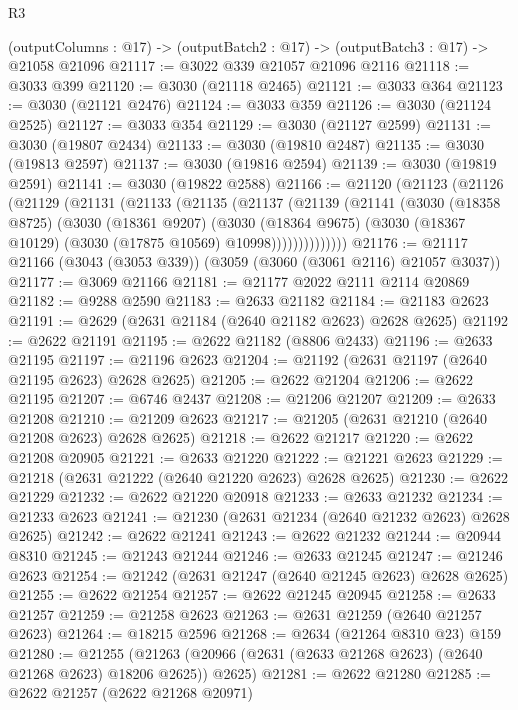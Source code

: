 \begin{lexlean}{R3}
\begin{coremodule}
  (outputColumns : @17) -> (outputBatch2 : @17) -> (outputBatch3 : @17) -> @21058 @21096
@21117 := @3022 @339 @21057 @21096 @2116
@21118 := @3033 @399
@21120 := @3030 (@21118 @2465)
@21121 := @3033 @364
@21123 := @3030 (@21121 @2476)
@21124 := @3033 @359
@21126 := @3030 (@21124 @2525)
@21127 := @3033 @354
@21129 := @3030 (@21127 @2599)
@21131 := @3030 (@19807 @2434)
@21133 := @3030 (@19810 @2487)
@21135 := @3030 (@19813 @2597)
@21137 := @3030 (@19816 @2594)
@21139 := @3030 (@19819 @2591)
@21141 := @3030 (@19822 @2588)
@21166 := @21120
    (@21123
      (@21126
        (@21129
          (@21131
            (@21133
              (@21135
                (@21137
                  (@21139
                    (@21141
                      (@3030
                        (@18358 @8725)
                        (@3030
                          (@18361 @9207)
                          (@3030
                            (@18364 @9675)
                            (@3030 (@18367 @10129) (@3030 (@17875 @10569) @10998))))))))))))))
@21176 := @21117 @21166 (@3043 (@3053 @339)) (@3059 (@3060 (@3061 @2116) @21057 @3037))
@21177 := @3069 @21166
@21181 := @21177 @2022 @2111 @2114 @20869
@21182 := @9288 @2590
@21183 := @2633 @21182
@21184 := @21183 @2623
@21191 := @2629 (@2631 @21184 (@2640 @21182 @2623) @2628 @2625)
@21192 := @2622 @21191
@21195 := @2622 @21182 (@8806 @2433)
@21196 := @2633 @21195
@21197 := @21196 @2623
@21204 := @21192 (@2631 @21197 (@2640 @21195 @2623) @2628 @2625)
@21205 := @2622 @21204
@21206 := @2622 @21195
@21207 := @6746 @2437
@21208 := @21206 @21207
@21209 := @2633 @21208
@21210 := @21209 @2623
@21217 := @21205 (@2631 @21210 (@2640 @21208 @2623) @2628 @2625)
@21218 := @2622 @21217
@21220 := @2622 @21208 @20905
@21221 := @2633 @21220
@21222 := @21221 @2623
@21229 := @21218 (@2631 @21222 (@2640 @21220 @2623) @2628 @2625)
@21230 := @2622 @21229
@21232 := @2622 @21220 @20918
@21233 := @2633 @21232
@21234 := @21233 @2623
@21241 := @21230 (@2631 @21234 (@2640 @21232 @2623) @2628 @2625)
@21242 := @2622 @21241
@21243 := @2622 @21232
@21244 := @20944 @8310
@21245 := @21243 @21244
@21246 := @2633 @21245
@21247 := @21246 @2623
@21254 := @21242 (@2631 @21247 (@2640 @21245 @2623) @2628 @2625)
@21255 := @2622 @21254
@21257 := @2622 @21245 @20945
@21258 := @2633 @21257
@21259 := @21258 @2623
@21263 := @2631 @21259 (@2640 @21257 @2623)
@21264 := @18215 @2596
@21268 := @2634 (@21264 @8310 @23) @159
@21280 := @21255
    (@21263 (@20966 (@2631 (@2633 @21268 @2623) (@2640 @21268 @2623) @18206 @2625)) @2625)
@21281 := @2622 @21280
@21285 := @2622 @21257 (@2622 @21268 @20971)

\end{coremodule}
\end{lexlean}
